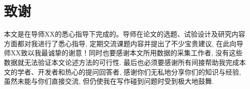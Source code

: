 \titleformat{\section}{\sanhao\bfseries\centering}{\thescetion}{1em}{}
\section*{致谢}
    本文是在导师XX的悉心指导下完成的。导师在论文的选题、试验设计及研究内容方面都对我进行了悉心指导, 定期交流课题内容并提出了不少宝贵建议, 在此向导师XX致以我最诚挚的谢意！同时也要感谢本文所用数据的采集工作者, 没有这些数据就无法验证本文论述方法的可行性. 最后也必须要感谢所有间接帮助我完成本文的学者、开发者和热心的提问回答者, 感谢你们无私地分享你们的知识与经验, 虽然未能与你们直接交流, 但仍使我在写作碰到问题时受到极大地鼓舞.